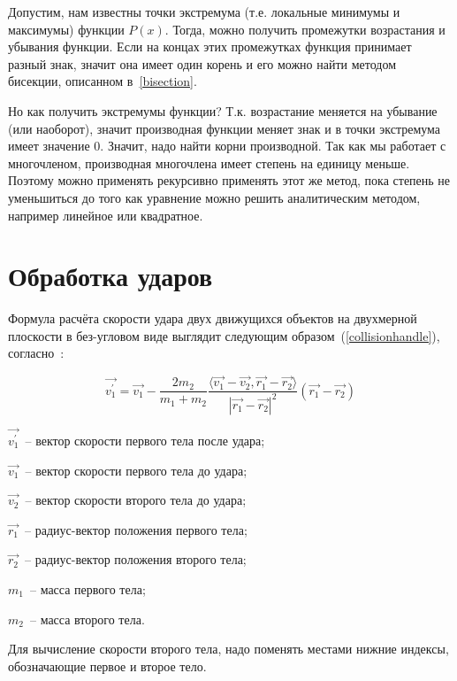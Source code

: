 Допустим, нам известны точки экстремума (т.е. локальные минимумы и максимумы) функции \(P(x)\).
Тогда, можно получить промежутки возрастания и убывания функции.
Если на концах этих промежутках функция принимает разный знак,
значит она имеет один корень и его можно найти методом бисекции, описанном в~\ref{bisection}.

Но как получить экстремумы функции? Т.к. возрастание меняется на убывание (или наоборот),
значит производная функции меняет знак и в точки экстремума имеет значение \(0\).
Значит, надо найти корни производной. Так как мы работает с многочленом, производная многочлена
имеет степень на единицу меньше. Поэтому можно применять рекурсивно применять этот же метод,
пока степень не уменьшиться до того как уравнение можно решить аналитическим методом,
например линейное или квадратное.

\section{Обработка ударов}

Формула расчёта скорости удара двух движущихся объектов на двухмерной плоскости в без-угловом виде
выглядит следующим образом~(\ref{collisionhandle}), согласно~\cite{wiki-ellastic-collision}:

\begin{equation}\label{collisionhandle}
  \vec{v_1^\prime} = \vec{v_1} - \frac{2 m_2}{m_1 + m_2}
  \frac{\langle \vec{v_1} - \vec{v_2}, \vec{r_1} - \vec{r_2} \rangle }{\left| \vec{r_1} - \vec{r_2} \right|^2}
  (\vec{r_1} - \vec{r_2})
\end{equation}

\begin{Underequation}
  \(\vec{v_1^\prime}\)~-- вектор скорости первого тела после удара;

  \(\vec{v_1}\)~-- вектор скорости первого тела до удара;

  \(\vec{v_2}\)~-- вектор скорости второго тела до удара;

  \(\vec{r_1}\)~-- радиус-вектор положения первого тела;

  \(\vec{r_2}\)~-- радиус-вектор положения второго тела;

  \(m_1\)~-- масса первого тела;

  \(m_2\)~-- масса второго тела.
\end{Underequation}

Для вычисление скорости второго тела, надо поменять местами нижние индексы, обозначающие первое и второе тело.

